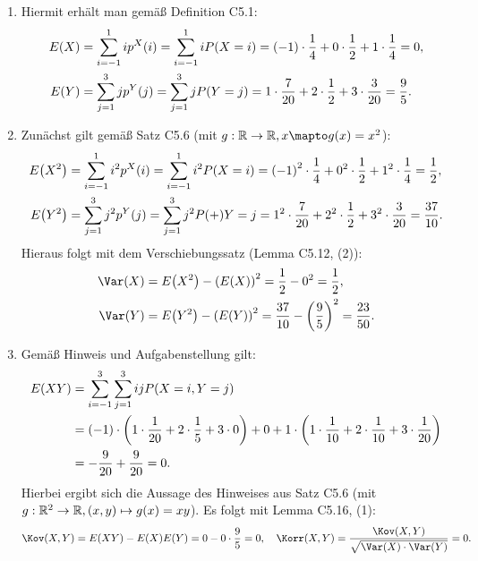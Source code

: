 \documentclass{exercise}
\begin{document}
    \begin{enumerate}
        \item Hiermit erhält man gemäß Definition C5.1:
        \begin{align*}
            E\parentheses*{X} &= \sum_{i = -1}^1 ip^X\parentheses*{i} = \sum_{i = -1}^1 iP\parentheses*{X = i} = \parentheses*{-1} \cdot \frac{1}{4} + 0 \cdot \frac{1}{2} + 1 \cdot \frac{1}{4} = 0,\\
            E\parentheses*{Y} &= \sum_{j = 1}^3 jp^Y\parentheses*{j} = \sum_{j = 1}^3 jP\parentheses*{Y = j} = 1 \cdot \frac{7}{20} + 2 \cdot \frac{1}{2} + 3 \cdot \frac{3}{20} = \frac{9}{5}.
        \end{align*}
        \item Zunächst gilt gemäß Satz C5.6 (mit \(g: \R \to \R, x \mapto g\parentheses*{x} = x^2\)):
        \begin{align*}
            E\parentheses*{X^2} &= \sum_{i = -1}^1 i^2 p^X\parentheses*{i} = \sum_{i = -1}^1 i^2 P\parentheses*{X = i} = \parentheses*{-1}^2 \cdot \frac{1}{4} + 0^2 \cdot \frac{1}{2} + 1^2 \cdot \frac{1}{4} = \frac{1}{2},\\
            E\parentheses*{Y^2} &= \sum_{j = 1}^3 j^2 p^Y\parentheses*{j} = \sum_{j = 1}^3 j^2 P\parentheses+{Y = j} = 1^2 \cdot \frac{7}{20} + 2^2 \cdot \frac{1}{2} + 3^2 \cdot \frac{3}{20} = \frac{37}{10}.
        \end{align*}
        Hieraus folgt mit dem Verschiebungssatz (Lemma C5.12, (2)):
        \begin{align*}
            \Var\parentheses*{X} &= E\parentheses*{X^2} - \parentheses*{E\parentheses*{X}}^2 = \frac{1}{2} - 0^2 = \frac{1}{2},\\
            \Var\parentheses*{Y} &= E\parentheses*{Y^2} - \parentheses*{E\parentheses*{Y}}^2 = \frac{37}{10} - \parentheses*{\frac{9}{5}}^2 = \frac{23}{50}.
        \end{align*}
        \item Gemäß Hinweis und Aufgabenstellung gilt:
        \begin{align*}
            E\parentheses*{XY} &= \sum_{i = -1}^3 \sum_{j = 1}^3 ijP\parentheses*{X = i, Y = j}\\
            &= \parentheses*{-1} \cdot \parentheses*{1 \cdot \frac{1}{20} + 2 \cdot \frac{1}{5} + 3 \cdot 0} + 0 + 1 \cdot \parentheses*{1 \cdot \frac{1}{10} + 2 \cdot \frac{1}{10} + 3 \cdot \frac{1}{20}}\\
            &= -\frac{9}{20} + \frac{9}{20} = 0.
        \end{align*}
        Hierbei ergibt sich die Aussage des Hinweises aus Satz C5.6 (mit \(g: \R^2 \to \R, \parentheses*{x, y} \mapsto g\parentheses*{x} = xy\)).
        Es folgt mit Lemma C5.16, (1):
        \[
            \Kov\parentheses*{X, Y} = E\parentheses*{XY} - E\parentheses*{X}E\parentheses*{Y} = 0 - 0 \cdot \frac{9}{5} = 0, \quad \Korr\parentheses*{X, Y} = \frac{\Kov\parentheses*{X, Y}}{\sqrt{\Var\parentheses*{X} \cdot \Var\parentheses*{Y}}} = 0.
        \]
    \end{enumerate}
    
\end{document}
